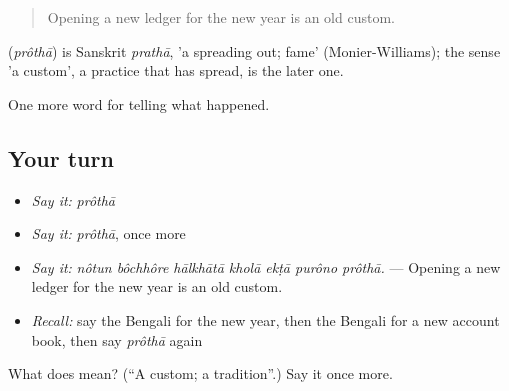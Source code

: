 \begin{quote}
Opening a new ledger for the new year is an old custom.
\end{quote}

\begin{cousinweb}
\textbf{} (\emph{prôthā}) is Sanskrit \emph{prathā}, 'a spreading out; fame' (Monier-Williams); the sense 'a custom', a practice that has spread, is the later one.
\end{cousinweb}

\begin{grammarlens}[title={What you've built}]
One more word for telling what happened.
\end{grammarlens}

\subsection*{Your turn}
\begin{itemize}
\raggedright
  \item \emph{Say it:} \emph{prôthā}
  \item \emph{Say it:} \emph{prôthā}, once more
  \item \emph{Say it:} \emph{nôtun bôchhôre hālkhātā kholā ekṭā purôno prôthā.} — Opening a new ledger for the new year is an old custom.
  \item \emph{Recall:} say the Bengali for the new year, then the Bengali for a new account book, then say \emph{prôthā} again
\end{itemize}

\begin{tcolorbox}[breakable,colback=teal!4,colframe=teal!35!black,title={Before you move on}]
What does  mean? (\textquotedblleft{}A custom; a tradition\textquotedblright{}.) Say it once more.
\end{tcolorbox}
